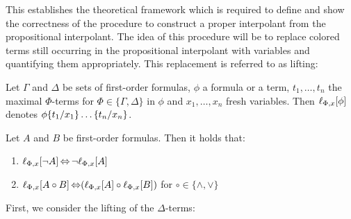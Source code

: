 This establishes the theoretical framework which is required to define and show the correctness of the procedure to construct a proper interpolant from the propositional interpolant.
The idea of this procedure will be to replace colored terms still occurring in the propositional interpolant with variables and quantifying them appropriately.
This replacement is referred to as lifting:

\begin{defi}[Lifting]
	Let $\Gamma$ and $\Delta$ be sets of first-order formulas, 
	$\phi$ a formula or a term, $t_1, \ldots, t_n$ the maximal $\Phi$-terms for $\Phi \in \{\Gamma, \Delta\}$ in $\phi$ and $x_1, \ldots, x_n$ fresh variables.
	Then $\lft{\Phi}{x}{\phi}$ denotes $\phi\abstraction{t_1/x_1}\ldots\abstraction{t_n/x_n}$.
\end{defi}

\begin{lemma} 
	\label{lemma:lift_commute}
	Let $A$ and $B$ be first-order formulas. Then it holds that:
	\begin{enumerate}
		\item $\lift{\Phi}{\lnot A}{x} \semiff \lnot \lift{\Phi}{A}{x}$
		\item $\lift{\Phi}{A \circ B}{x} \semiff ( \lift{\Phi}{A}{x} \circ \lift{\Phi}{B}{x} )$ for $\circ \in \{\land, \lor\}$
	\end{enumerate}
\end{lemma}

First, we consider the lifting of the $\Delta$-terms:\nopagebreak[4]

